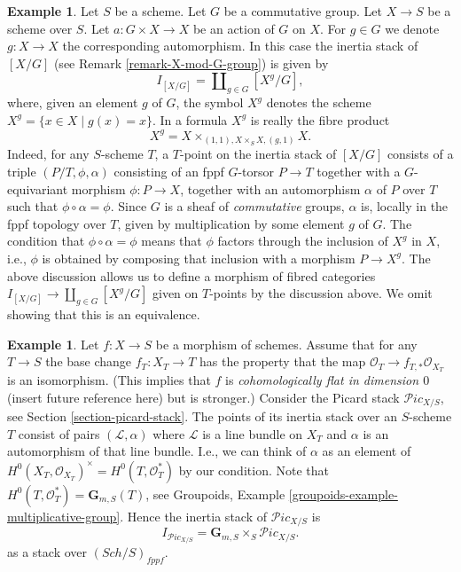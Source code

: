 \documentclass{stacks-project}
\theoremstyle{plain}
\theoremstyle{definition}
\newtheorem{example}[subsection]{Example}
\theoremstyle{remark}
\numberwithin{equation}{subsection}
\def\Sch{\mathit{Sch}}
\def\Picardstack{\mathcal{P}\!\mathit{ic}}
\begin{document}
\begin{example}
\label{example-inertia-stack-of-X-mod-G}
Let $S$ be a scheme. Let $G$ be a commutative group.
Let $X \to S$ be a scheme over $S$.
Let $a : G \times X \to X$ be an action of $G$ on $X$.
For $g \in G$ we denote $g : X \to X$ the corresponding automorphism.
In this case the inertia stack of $[X/G]$ (see
Remark \ref{remark-X-mod-G-group})
is given by
$$
I_{[X/G]} = \coprod\nolimits_{g\in G} [X^g/G],
$$
where, given an element $g$ of $G$, the symbol $X^g$ denotes the
scheme $X^g = \{x \in X \mid g(x) = x\}$. In a formula
$X^g$ is really the fibre
product
$$
X^g =  X \times_{(1, 1), X \times_S X, (g, 1)} X.
$$
Indeed, for any $S$-scheme $T$, a
$T$-point on the inertia stack of $[X/G]$ consists of a
triple $(P/T, \phi, \alpha)$ consisting of an fppf $G$-torsor
$P \to T$ together with a $G$-equivariant morphism
$\phi : P \to X$, together
with an automorphism $\alpha$ of $P$ over $T$ such that
$\phi \circ \alpha = \phi$.
Since $G$ is a sheaf of \emph{commutative} groups,
$\alpha$ is, locally in the fppf topology over $T$,
given by multiplication by some element $g$ of $G$.
The condition that $\phi \circ \alpha = \phi$ means that $\phi$
factors through the inclusion of $X^g$
in $X$, i.e., $\phi$ is obtained by composing that inclusion with a
morphism $P \to X^g$.
The above discussion allows us to define a morphism of fibred categories
$I_{[X/G]} \to \coprod_{g\in G} [X^g/G]$ given on $T$-points by the discussion
above. We omit showing that this is an equivalence.
\end{example}

\begin{example}
\label{example-inertia-stack-of-picard}
Let $f : X \to S$ be a morphism of schemes.
Assume that for any $T \to S$ the base change $f_T : X_T \to T$
has the property that the map $\mathcal{O}_T \to f_{T, *}\mathcal{O}_{X_T}$
is an isomorphism. (This implies that $f$ is
{\it cohomologically flat in dimension $0$} (insert future reference here)
but is stronger.) Consider the Picard stack $\Picardstack_{X/S}$, see
Section \ref{section-picard-stack}.
The points of its inertia stack over an
$S$-scheme $T$ consist of pairs $(\mathcal{L}, \alpha)$
where $\mathcal{L}$ is a line bundle
on $X_T$ and $\alpha$ is an automorphism of that line bundle.
I.e., we can think of $\alpha$ as an element of
$H^0(X_T, \mathcal{O}_{X_T})^\times = H^0(T, \mathcal{O}_T^*)$
by our condition. Note that $H^0(T, \mathcal{O}_T^*) = \mathbf{G}_{m, S}(T)$,
see Groupoids, Example \ref{groupoids-example-multiplicative-group}.
Hence the inertia stack of $\Picardstack_{X/S}$ is
$$
I_{\Picardstack_{X/S}} = \mathbf{G}_{m, S} \times_S \Picardstack_{X/S}.
$$
as a stack over $(\Sch/S)_{fppf}$.
\end{example}
\end{document}
